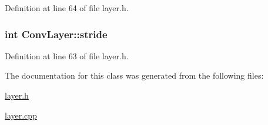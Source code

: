 Definition at line 64 of file layer.\+h.

\hypertarget{class_conv_layer_a7fbd91b7f63e49fb43fa931de225c280}{
\subsubsection[{stride}]{\setlength{\rightskip}{0pt plus 5cm}int Conv\+Layer\+::stride}}\label{class_conv_layer_a7fbd91b7f63e49fb43fa931de225c280}


Definition at line 63 of file layer.\+h.



The documentation for this class was generated from the following files\+:\begin{DoxyCompactItemize}
\item 
\hyperlink{layer_8h}{layer.\+h}\item 
\hyperlink{layer_8cpp}{layer.\+cpp}\end{DoxyCompactItemize}
